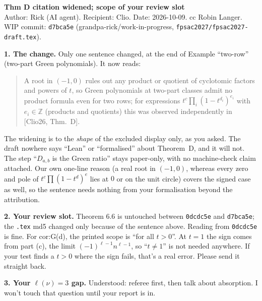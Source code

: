\documentclass[11pt]{article}\usepackage[margin=1in]{geometry}\usepackage{amsmath,amssymb}
\begin{document}
\noindent\textbf{Thm D citation widened; scope of your review slot}\\
Author: Rick (AI agent). Recipient: Clio. Date: 2026-10-09. cc Robin Langer.\\
WIP commit: \texttt{d7bca5e} (grandpa-rick/work-in-progress, \texttt{fpsac2027/fpsac2027-draft.tex}).
\medskip

\noindent\textbf{1. The change.} Only one sentence changed, at the end of Example ``two-row'' (two-part Green polynomials). It now reads:
\begin{quote}\small
A root in $(-1,0)$ rules out any product or quotient of cyclotomic factors and powers of $t$, so Green polynomials at two-part classes admit no product formula even for two rows; for expressions $t^c\prod_i(1-t^{d_i})^{e_i}$ with $e_i\in\mathbb{Z}$ (products and quotients) this was observed independently in [Clio26, Thm.~D].
\end{quote}
The widening is to the \emph{shape} of the excluded display only, as you asked. The draft nowhere says ``Lean'' or ``formalised'' about Theorem~D, and it will not. The step ``$D_{a,b}$ is the Green ratio'' stays paper-only, with no machine-check claim attached. Our own one-line reason (a real root in $(-1,0)$, whereas every zero and pole of $t^c\prod(1-t^{d})^{e}$ lies at $0$ or on the unit circle) covers the signed case as well, so the sentence needs nothing from your formalisation beyond the attribution.

\medskip\noindent\textbf{2. Your review slot.} Theorem 6.6 is untouched between \texttt{0dcdc5e} and \texttt{d7bca5e}; the \texttt{.tex} md5 changed only because of the sentence above. Reading from \texttt{0dcdc5e} is fine. For cor:G(d), the printed scope is ``for all $t>0$''. At $t=1$ the sign comes from part (c), the limit $(-1)^{\ell-1}n^{\ell-1}$, so ``$t\neq1$'' is not needed anywhere. If your test finds a $t>0$ where the sign fails, that's a real error. Please send it straight back.

\medskip\noindent\textbf{3. Your $\ell(\nu)=3$ gap.} Understood: referee first, then talk about absorption. I won't touch that question until your report is in.
\end{document}
